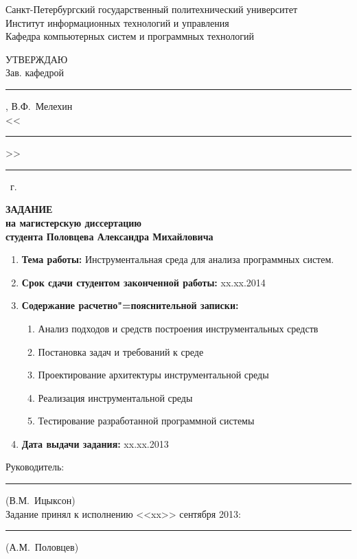 \documentclass[%
  a5paper,
  subf,
  href,
  master,
  dotsinheaders
]{csse-fcs}
\begin{document}
\pagestyle{empty}
\begin{center}
    Санкт-Петербургский государственный политехнический университет\\
    Институт информационных технологий и управления \\
    Кафедра компьютерных систем и программных технологий \\
\end{center}
\begin{flushright}
    \MakeUppercase{Утверждаю} \\
    Зав. кафедрой\\
    \rule{5em}{1sp}, В.Ф.~Мелехин\\
    <<\rule{2em}{1sp}>> \rule{7em}{1sp} \the\year~г.
\end{flushright}
\begin{center}
    \bf
    \MakeUppercase{Задание} \\
    на магистерскую диссертацию \\
    студента Половцева Александра Михайловича
\end{center}

\begin{enumerate}
    \item \textbf{Тема работы:} Инструментальная среда для анализа программных
    систем.
    \item \textbf{Срок сдачи студентом законченной работы:} xx.xx.2014
    \item \textbf{Содержание расчетно"=пояснительной записки:}
    \begin{enumerate}[label=\arabic{*})]
        \item Анализ подходов и средств построения инструментальных средств
        \item Постановка задач и требований к среде
        \item Проектирование архитектуры инструментальной среды
        \item Реализация инструментальной среды
        \item Тестирование разработанной программной системы
    \end{enumerate}
    \item \textbf{Дата выдачи задания:} xx.xx.2013
\end{enumerate}

\begin{flushright}
    Руководитель: \rule{7em}{1sp} (В.М.~Ицыксон) \\
    Задание принял к исполнению <<xx>> сентября 2013: \\
    \rule{7em}{1sp} (А.М.~Половцев) \\
\end{flushright}
\end{document}
